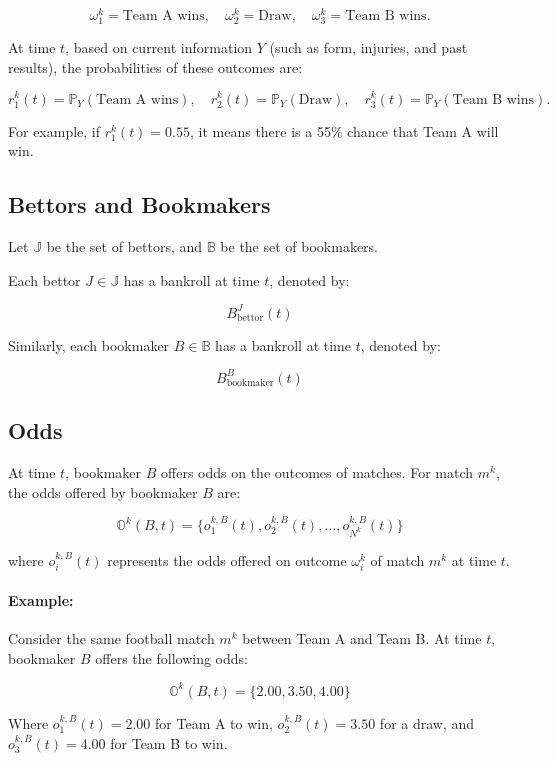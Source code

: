 \[
\omega_1^k = \text{Team A wins}, \quad \omega_2^k = \text{Draw}, \quad \omega_3^k = \text{Team B wins}.
\]

At time \( t \), based on current information \( Y \) (such as form, injuries, and past results), the probabilities of these outcomes are:

\[
r_1^k(t) = \mathbb{P}_Y(\text{Team A wins}), \quad r_2^k(t) = \mathbb{P}_Y(\text{Draw}), \quad r_3^k(t) = \mathbb{P}_Y(\text{Team B wins}).
\]

For example, if \( r_1^k(t) = 0.55 \), it means there is a 55\% chance that Team A will win.

\subsection{Bettors and Bookmakers}

Let \( \mathbb{J} \) be the set of bettors, and \( \mathbb{B} \) be the set of bookmakers.

Each bettor \( J \in \mathbb{J} \) has a bankroll at time \( t \), denoted by:

\[
B_{\text{bettor}}^J(t)
\]

Similarly, each bookmaker \( B \in \mathbb{B} \) has a bankroll at time \( t \), denoted by:

\[
B_{\text{bookmaker}}^B(t)
\]

\subsection{Odds}

At time \( t \), bookmaker \( B \) offers odds on the outcomes of matches. For match \( m^k \), the odds offered by bookmaker \( B \) are:

\[
\mathbb{O}^k(B, t) = \{ o_1^{k,B}(t), o_2^{k,B}(t), \dots, o_{N^k}^{k,B}(t) \}
\]

where \( o_i^{k,B}(t) \) represents the odds offered on outcome \( \omega_i^k \) of match \( m^k \) at time \( t \). \\

\paragraph{Example:}
Consider the same football match \( m^k \) between Team A and Team B. At time \( t \), bookmaker \( B \) offers the following odds:

\[
\mathbb{O}^k(B, t) = \{ 2.00, 3.50, 4.00 \}
\]

Where \( o_1^{k,B}(t) = 2.00 \) for Team A to win, \( o_2^{k,B}(t) = 3.50 \) for a draw, and \( o_3^{k,B}(t) = 4.00 \) for Team B to win.

